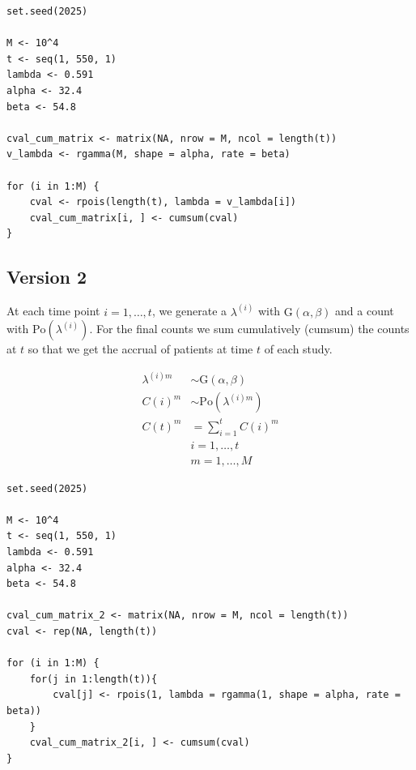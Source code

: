 \begin{knitrout}
\color{fgcolor}\begin{kframe}
\begin{verbatim}
set.seed(2025)

M <- 10^4
t <- seq(1, 550, 1)
lambda <- 0.591
alpha <- 32.4
beta <- 54.8

cval_cum_matrix <- matrix(NA, nrow = M, ncol = length(t))
v_lambda <- rgamma(M, shape = alpha, rate = beta)

for (i in 1:M) {
	cval <- rpois(length(t), lambda = v_lambda[i])
	cval_cum_matrix[i, ] <- cumsum(cval)
}
\end{verbatim}
\end{kframe}
\end{knitrout}

\subsection{Version 2}

At each time point $i=1,\ldots, t$, we generate a $\lambda^{(i)}$ with $\textrm{G}(\alpha, \beta)$ and a count with $\textrm{Po}(\lambda^{(i)})$. For the final counts we sum cumulatively (cumsum) the counts at $t$ so that we get the accrual of patients at time $t$ of each study.

\begin{align*}
\lambda^{(i)m} &\sim \textrm{G}(\alpha, \beta) \\
C (i)^m&\sim \textrm{Po} (\lambda^{(i)m})\\
C(t)^m &= \sum_{i=1}^tC(i)^m \\
& i = 1, \ldots, t \\
& m = 1, \ldots, M 
\end{align*}



\begin{knitrout}
\color{fgcolor}\begin{kframe}
\begin{verbatim}
set.seed(2025)

M <- 10^4
t <- seq(1, 550, 1)
lambda <- 0.591
alpha <- 32.4
beta <- 54.8

cval_cum_matrix_2 <- matrix(NA, nrow = M, ncol = length(t))
cval <- rep(NA, length(t))

for (i in 1:M) {
	for(j in 1:length(t)){
		cval[j] <- rpois(1, lambda = rgamma(1, shape = alpha, rate = beta))
	}
	cval_cum_matrix_2[i, ] <- cumsum(cval)
}
\end{verbatim}
\end{kframe}
\end{knitrout}


